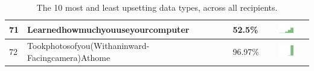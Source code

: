 \begin{table}[t]
\begin{center}
\begin{tabular}{| p{0.5cm} | p{7cm} | p{1cm} | c |}
71 & Learnedhowmuchyouuseyourcomputer & 52.5\% & \includegraphics[width = 2cm, height = 0.5cm]{../learnedhowmuchyouuseyourcomputerPUBLIC} \\ \hline 
72 & Tookphotosofyou(Withaninward-Facingcamera)Athome & 96.97\% & \includegraphics[width = 2cm, height = 0.5cm]{../tookphotosofyou(withaninward-facingcamera)athomePUBLIC} \\ \hline 
\hline
\end{tabular}
\caption{The 10 most and least upsetting data types, across all recipients.}
\label{top10}
\end{center}
\end{table}
